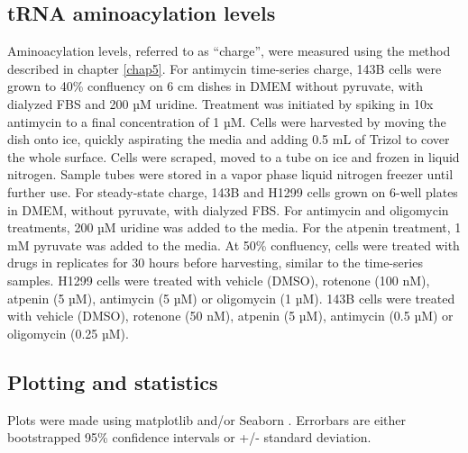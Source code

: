 \subsection{tRNA aminoacylation levels}
Aminoacylation levels, referred to as ``charge'', were measured using the method described in chapter \ref{chap5}.
For antimycin time-series charge, 143B cells were grown to 40\% confluency on 6 cm dishes in DMEM without pyruvate, with dialyzed FBS and 200 µM uridine.
Treatment was initiated by spiking in 10x antimycin to a final concentration of 1 µM.
Cells were harvested by moving the dish onto ice, quickly aspirating the media and adding 0.5 mL of Trizol to cover the whole surface.
Cells were scraped, moved to a tube on ice and frozen in liquid nitrogen.
Sample tubes were stored in a vapor phase liquid nitrogen freezer until further use.
For steady-state charge, 143B and H1299 cells grown on 6-well plates in DMEM, without pyruvate, with dialyzed FBS.
For antimycin and oligomycin treatments, 200 µM uridine was added to the media.
For the atpenin treatment, 1 mM pyruvate was added to the media.
At 50\% confluency, cells were treated with drugs in replicates for 30 hours before harvesting, similar to the time-series samples.
H1299 cells were treated with vehicle (DMSO), rotenone (100 nM), atpenin (5 µM), antimycin (5 µM) or oligomycin (1 µM).
143B cells were treated with vehicle (DMSO), rotenone (50 nM), atpenin (5 µM), antimycin (0.5 µM) or oligomycin (0.25 µM).


\subsection{Plotting and statistics}
Plots were made using matplotlib and/or Seaborn \cite{Waskom2021-ar}.
Errorbars are either bootstrapped 95\% confidence intervals or +/- standard deviation.








